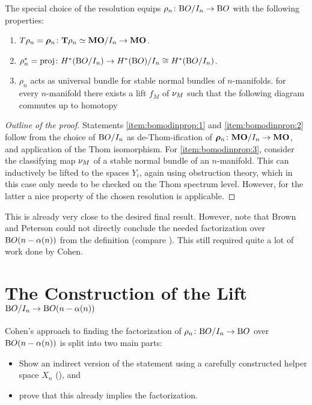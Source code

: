 \begin{Thm*}
  The special choice of the resolution equips
  $\rho_n\colon\mathrm{B}O/I_{n}\to\mathrm{B}O$ with the following properties:
  \begin{enumerate}
  \item\label{item:bomodinprop:1}
    $T{\rho_n} = \bm{\rho}_n\colon \bm{\mathrm{T}}{\rho_n}\simeq\bm{\mathrm{MO}}/I_{n}\to\bm{\mathrm{MO}}$.
  \item\label{item:bomodinprop:2}
    ${\rho}^*_n=\mathrm{proj}\colon
    H^*(\mathrm{B}O/I_{n}) \to H^*(\mathrm{B}O)/I_{n}\cong H^*(\mathrm{B}O/I_{n})$.
  \item\label{item:bomodinprop:3}
    $\rho_n$ acts as universal bundle for stable normal bundles of
    $n$-manifolds.
    \Idest for every $n$-manifold there exists a lift $f_M$ of
    $\nu_{M}$ 
    such that the following diagram commutes up to homotopy
    \begin{center}
    \end{center}
  \end{enumerate}
  \begin{proof}[Outline of the proof]
    Statements \ref{item:bomodinprop:1} and \ref{item:bomodinprop:2}
    follow from the choice of $\mathrm{B}O/I_{n}$ as de-Thom-ification of
    $\bm{\rho}_n\colon\bm{\mathrm{MO}}/I_{n}\to\bm{\mathrm{MO}}$, and application of the Thom
    isomorphism.
    For \ref{item:bomodinprop:3}, consider the classifying map $\nu_{M}$
    of a stable normal bundle of an $n$-manifold. This can inductively
    be lifted to the spaces $Y_i$, again
    using obstruction theory,
    which in this case only needs to be checked on the Thom spectrum
    level. However, for the latter a nice property of the chosen
    resolution is applicable.
  \end{proof}
\end{Thm*}

This is already very close to the desired final result.
However, note that Brown and Peterson could not directly conclude the
needed factorization over $\mathrm{B}O(n-\alpha(n))$ from the definition
(compare \cite{brownpeterson}).
This still required quite a lot of work done by Cohen.


\section*{The Construction of the Lift $\mathrm{B}O/I_{n}\to\mathrm{B}O(n-\alpha(n))$}
Cohen's approach to finding the factorization of
$\rho_n\colon\mathrm{B}O/I_{n}\to\mathrm{B}O$ over $\mathrm{B}O(n-\alpha(n))$ is split into two
main parts:
\begin{itemize}
\item Show an indirect version of the statement using a carefully
  constructed helper space $X_n$ (\cite[Lemma~B]{cohen}), and
\item prove that this already implies the factorization.
\end{itemize}

